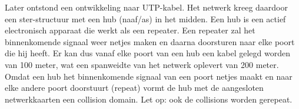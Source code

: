 Later ontstond een ontwikkeling naar UTP-kabel. Het netwerk kreeg daardoor een ster-structuur met een hub (naaf/as) in het midden. Een hub is een actief electronisch apparaat die werkt als een repeater. Een repeater zal het binnenkomende signaal weer netjes maken en daarna doorsturen naar elke poort die hij heeft. Er kan dus vanaf elke poort van een hub een kabel gelegd worden van 100 meter, wat een spanweidte van het netwerk oplevert van 200 meter. Omdat een hub het binnenkomende signaal van een poort netjes maakt en naar elke andere poort doorstuurt (repeat) vormt de hub met de aangesloten netwerkkaarten een collision domain. Let op: ook de collisions worden gerepeat.

